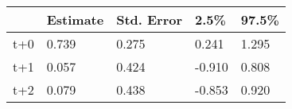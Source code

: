 \begin{tabular}{lllll}
  \toprule
  & Estimate & Std. Error & 2.5\% & 97.5\% \\ 
  \midrule
t+0 & 0.739 & 0.275 & 0.241 & 1.295 \\ 
  t+1 & 0.057 & 0.424 & -0.910 & 0.808 \\ 
  t+2 & 0.079 & 0.438 & -0.853 & 0.920 \\ 
   \bottomrule
\end{tabular}
